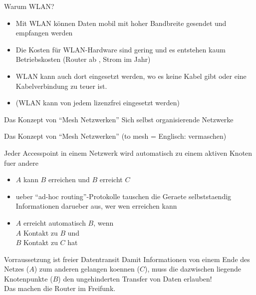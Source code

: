 \documentclass[aspectratio=43]{beamer}
\begin{document}
\begin{frame}{Warum WLAN?}
	\begin{itemize}
		\item Mit WLAN können Daten mobil mit hoher Bandbreite gesendet und empfangen werden
		\item Die Kosten für WLAN-Hardware sind gering und es entstehen kaum Betriebskosten (Router ab , Strom  im Jahr)
		\item WLAN kann auch dort eingesetzt werden, wo es keine Kabel gibt oder eine Kabelverbindung zu teuer ist. %
		\item (WLAN kann von jedem lizenzfrei eingesetzt werden) %
	\end{itemize}
\end{frame}

\begin{frame}{Das Konzept von ``Mesh Netzwerken''} %
	Sich selbst organisierende Netzwerke
\end{frame}

\begin{frame}{Das Konzept von ``Mesh Netzwerken''} %
	(to mesh = Englisch: vermaschen)

	Jeder Accesspoint in einem Netzwerk wird automatisch zu einem aktiven Knoten fuer andere
	\begin{itemize}
		\item $A$ kann $B$ erreichen und $B$ erreicht $C$
		\item ueber ``ad-hoc routing''-Protokolle tauschen die Geraete selbststaendig Informationen darueber aus, wer wen erreichen kann
		\item $A$ erreicht automatisch $B$, wenn\\
		$A$ Kontakt zu $B$ und\\
		$B$ Kontakt zu $C$ hat
	\end{itemize}
\end{frame}

\begin{frame}{Vorraussetzung ist freier Datentransit} %
	Damit Informationen von einem Ende des Netzes ($A$) zum anderen gelangen koennen ($C$), muss die dazwischen liegende Knotenpunkte ($B$) den ungehinderten Transfer von Daten erlauben!\\
	Das machen die Router im Freifunk.
\end{frame}
\end{document}
